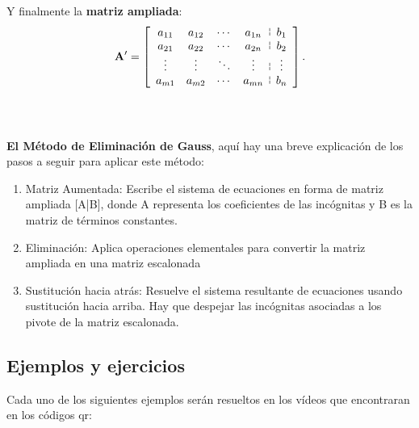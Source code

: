 \documentclass[11pt]{article}
\newcounter{teo}%
\begin{document}
\begin{mdframed}[style= teoSty,frametitle={Definición:  {\it Dado un sistema de ecuaciones de $m$ ecuaciones y $n$ incógnita.
} }]
\begin{itemize}
\begin{minipage}{.4\textwidth}
\end{minipage}\qquad\qquad\begin{minipage}{.4\textwidth}
\item  Y finalmente la {\bf matriz ampliada}: 
\[\mathbf{A'}= \left[\begin{array}{cccc  @{\ \, \brokenvert \ \, }  c}
a_{11} & a_{12} & \cdots & a_{1n} & b_1 \\
a_{21} & a_{22} & \cdots & a_{2n} & b_2 \\
\vdots & \vdots & \ddots & \vdots & \vdots \\
a_{m1} & a_{m2} & \cdots & a_{mn} & b_n
\end{array} \right]. \]
\ \, \\[3mm] \,
\end{minipage}  


\end{itemize}


\end{mdframed}












{ \bf El Método de Eliminación de Gauss},  aquí hay una breve explicación de los pasos a seguir para aplicar este método:
\begin{enumerate}[$1^\circ$]
    \item Matriz Aumentada: Escribe el sistema de ecuaciones en forma de matriz ampliada [A|B], donde A representa los coeficientes de las incógnitas y B es la matriz de términos constantes.

\item  Eliminación: Aplica operaciones elementales para convertir la matriz ampliada en una matriz escalonada

\item  Sustitución hacia atrás: Resuelve el sistema resultante de ecuaciones usando sustitución hacia arriba. Hay que despejar las incógnitas asociadas a los pivote de la matriz escalonada.  

\end{enumerate} 

\subsection{Ejemplos y ejercicios}
Cada uno de los siguientes ejemplos serán resueltos en los  vídeos que encontraran en los códigos qr: 
\end{document}
